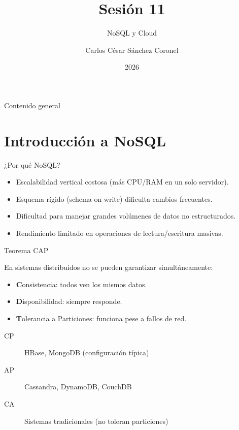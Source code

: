\documentclass[aspectratio=169, 10pt, xcolor=table]{beamer}
\title[SESIÓN 11 BBDD]{\textbf{Sesión 11}}
\subtitle{NoSQL y Cloud}
\author[Prof. C. Sánchez C.]{Carlos César Sánchez Coronel}
\institute{\textbf{BASES DE DATOS}}
\date{2026}
\begin{document}
\begin{frame}
    \titlepage
\end{frame}

\begin{frame}{Contenido general}
    \tableofcontents
\end{frame}

\section{Introducción a NoSQL}

\begin{frame}{¿Por qué NoSQL?}
    \begin{itemize}
        \item Escalabilidad vertical costosa (más CPU/RAM en un solo servidor).
        \item Esquema rígido (schema-on-write) dificulta cambios frecuentes.
        \item Dificultad para manejar grandes volúmenes de datos no estructurados.
        \item Rendimiento limitado en operaciones de lectura/escritura masivas.
    \end{itemize}
\end{frame}

\begin{frame}{Teorema CAP}
    \begin{block}{En sistemas distribuidos no se pueden garantizar simultáneamente:}
        \begin{itemize}
            \item \textbf{C}onsistencia: todos ven los mismos datos.
            \item \textbf{D}isponibilidad: siempre responde.
            \item \textbf{T}olerancia a Particiones: funciona pese a fallos de red.
        \end{itemize}
    \end{block}
    \begin{description}
        \item[CP] HBase, MongoDB (configuración típica)
        \item[AP] Cassandra, DynamoDB, CouchDB
        \item[CA] Sistemas tradicionales (no toleran particiones)
    \end{description}
\end{frame}
\end{document}
